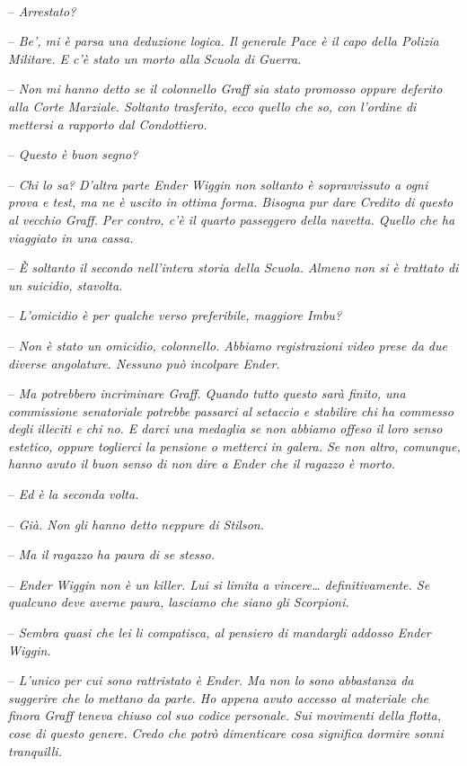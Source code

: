 {~}

{-- \emph{Arrestato?}}

{-- \emph{Be', mi è parsa una deduzione logica. Il generale Pace è il
		capo della Polizia Militare. E c'è stato un morto alla Scuola di
		Guerra.}}

{-- \emph{Non mi hanno detto se il colonnello Graff sia stato promosso
		oppure deferito alla Corte Marziale. Soltanto trasferito, ecco quello
		che so, con l'ordine di mettersi a rapporto dal Condottiero.}}

{-- \emph{Questo è buon segno?}}

{-- \emph{Chi lo sa? D'altra parte Ender Wiggin non soltanto è
		sopravvissuto a ogni prova e test, ma ne è uscito in ottima forma.
		Bisogna pur dare Credito di questo al vecchio Graff. Per contro, c'è il
		quarto passeggero della navetta. Quello che ha viaggiato in una cassa.}}

{-- \emph{È soltanto il secondo nell'intera storia della Scuola. Almeno
		non si è trattato di un suicidio, stavolta.}}

{-- \emph{L'omicidio è per qualche verso preferibile, maggiore Imbu?}}

{-- \emph{Non è stato un omicidio, colonnello. Abbiamo registrazioni
		video prese da due diverse angolature. Nessuno può incolpare Ender.}}

{-- \emph{Ma potrebbero incriminare Graff. Quando tutto questo sarà
		finito, una commissione senatoriale potrebbe passarci al setaccio e
		stabilire chi ha commesso degli illeciti e chi no. E darci una medaglia
		se non abbiamo offeso il loro senso estetico, oppure toglierci la
		pensione o metterci in galera. Se non altro, comunque, hanno avuto il
		buon senso di non dire a Ender che il ragazzo è morto.}}

{-- \emph{Ed è la seconda volta.}}

{-- \emph{Già. Non gli hanno detto neppure di Stilson.}}

{-- \emph{Ma il ragazzo ha paura di se stesso.}}

{-- \emph{Ender Wiggin non è un killer. Lui si limita a vincere\ldots{}
		definitivamente. Se qualcuno deve averne paura, lasciamo che siano gli
		Scorpioni.}}

{-- \emph{Sembra quasi che lei li compatisca, al pensiero di mandargli
		addosso Ender Wiggin.}}

{-- \emph{L'unico per cui sono rattristato è Ender. Ma non lo sono
		abbastanza da suggerire che lo mettano da parte. Ho appena avuto accesso
		al materiale che finora Graff teneva chiuso col suo codice personale.
		Sui movimenti della flotta, cose di questo genere. Credo che potrò
		dimenticare cosa significa dormire sonni tranquilli.}}

